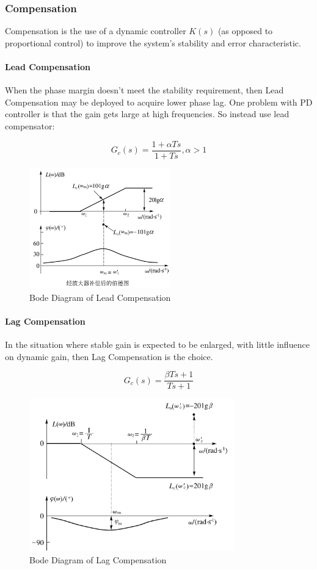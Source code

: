\subsubsection{Compensation}
Compensation is the use of a dynamic controller $K(s)$ (as opposed to proportional control) to improve the system's stability and error characteristic.

\paragraph{Lead Compensation}

When the phase margin doesn't meet the stability requirement, then Lead Compensation may be deployed to acquire lower phase lag. One problem with PD controller is that the gain gets large at high frequencies. So instead use lead compensator:

$$G_c(s)=\frac{1+\alpha Ts}{1+Ts}, \alpha >1$$

\begin{figure}
  \centering
  \includegraphics[width=2.4in]{fig/Lead_Compensation.png}
  \caption{Bode Diagram of Lead Compensation}\label{fig_lead}
\end{figure}


\paragraph{Lag Compensation}

In the situation where stable gain is expected to be enlarged, with little influence on dynamic gain, then Lag Compensation is the choice.

$$G_c(s)=\frac{\beta Ts+1}{Ts+1}$$

\begin{figure}
  \centering
  \includegraphics[width=3.5in]{fig/Lag_Compensation.png}
  \caption{Bode Diagram of Lag Compensation}\label{fig_lag}
\end{figure}


